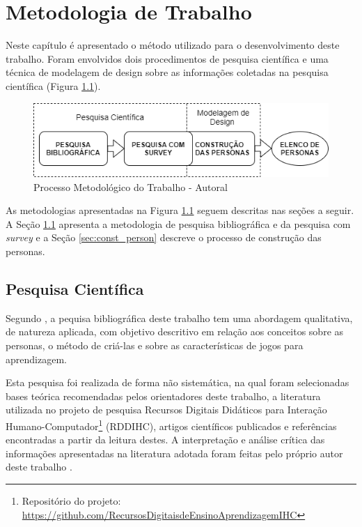 \chapter{Metodologia de Trabalho}
\label{chap:Metodo}

Neste capítulo é apresentado o método utilizado para o desenvolvimento deste trabalho. Foram envolvidos dois procedimentos de pesquisa científica e uma técnica de modelagem de design sobre as informações coletadas na pesquisa científica (Figura \ref{Fig:geral_flow.png}).

\begin{figure}[htbp]
	\centering
	\includegraphics[keepaspectratio=true,scale=0.6]{figuras/metodologia/fluxo geral.png}
	\caption{Processo Metodológico do Trabalho - Autoral}
	\label{Fig:geral_flow.png}
\end{figure}

As metodologias apresentadas na Figura \ref{Fig:geral_flow.png} seguem descritas nas seções a seguir. A Seção \ref{sec:pesq_cient} apresenta a metodologia de pesquisa bibliográfica e da pesquisa com \textit{survey} e a Seção \ref{sec:const_person} descreve o processo de construção das personas. 


\section{Pesquisa Científica} 
\label{sec:pesq_cient}

Segundo , a pequisa bibliográfica deste trabalho tem uma abordagem qualitativa, de natureza aplicada, com objetivo descritivo em relação aos conceitos sobre as personas, o método de criá-las e sobre as características de jogos para aprendizagem.

Esta pesquisa foi realizada de forma não sistemática, na qual foram selecionadas bases teórica \cite{barbosa_silva, BarbosaEtAl2021, cooper07} recomendadas pelos orientadores deste trabalho, a literatura utilizada no projeto de pesquisa Recursos Digitais Didáticos para Interação Humano-Computador\footnote{Repositório do projeto: \url{https://github.com/RecursosDigitaisdeEnsinoAprendizagemIHC}} (RDDIHC), artigos científicos publicados \cite{deSales_SousaeSilva_2020, silva_sales_mendes2021} e referências encontradas a partir da leitura destes. A interpretação e análise crítica das informações apresentadas na literatura adotada foram feitas pelo próprio autor deste trabalho \cite{ROTHER2007}. 

